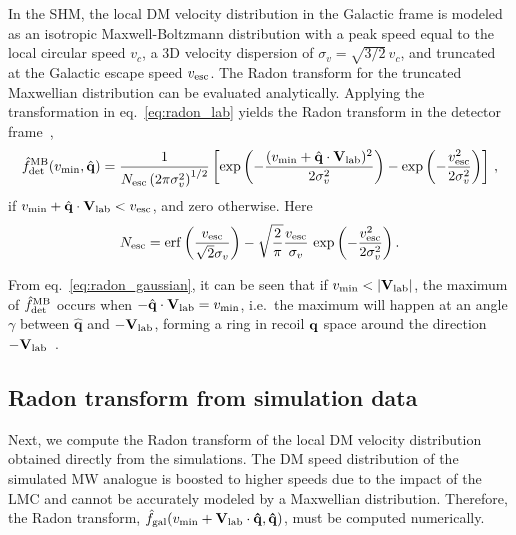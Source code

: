 \documentclass[a4paper,11pt]{article}
\begin{document}
In the SHM, the local DM velocity distribution in the Galactic frame is modeled as an isotropic Maxwell-Boltzmann distribution with a peak speed equal to the local circular speed $v_c$, a 3D velocity dispersion of $\sigma_v=\sqrt{3/2}\,v_c$, and truncated at the Galactic escape speed  $v_{\rm esc}$. The Radon transform for the truncated Maxwellian distribution can be evaluated analytically. Applying the transformation in eq.~\eqref{eq:radon_lab} yields the Radon transform in the detector frame~\cite{Gondolo:2002np},
%
\begin{equation}
    \hat{f}_{\rm{det}}^{\rm MB}(v_{\rm min},\hat{\mathbf{q}}) = \frac{1}{N_{\rm esc}\left(2 \pi \sigma_v^2 \right)^{1/2} }\left[\exp\left(- \frac{(v_{\rm min} + \hat{\mathbf{q}}\cdot \mathbf{V}_{\rm{lab}})^2}{2\sigma_{v}^2}\right)-\exp\left(-\frac{v_{\rm esc}^2}{2\sigma_v^2
    }\right)\right]\,,
    \label{eq:radon_gaussian}
\end{equation}
if $v_{\rm min}+\hat{\bf q}\cdot {\bf V}_{\rm lab}<v_{\rm esc}$, and zero otherwise. Here
\begin{equation}
N_{\rm esc}={\rm erf}\left(\frac{v_{\rm esc}}{\sqrt{2}\sigma_v}\right)-\sqrt{\frac{2}{\pi}}\frac{v_{\rm esc}}{\sigma_v}\,\exp\left(-\frac{v_{\rm esc}^2}{2\sigma_v^2}\right).
\end{equation}

From eq.~\eqref{eq:radon_gaussian}, it can be seen that if $v_{\rm min} < |\mathbf{V}_{\rm{lab}}|$, the maximum of $\hat f_{\rm det}^{\rm MB}$ occurs when $-\hat{\mathbf{q}}\cdot \mathbf{V}_{\rm lab} = v_{\rm min}$, i.e.~the maximum will happen at an angle $\gamma$ between $\hat{\mathbf{q}}$ and $-\mathbf{V}_{\rm{lab}}$, forming a ring in recoil ${\bf q}$ space around the direction $-\mathbf{V}_{\rm{lab}}$~\cite{Bozorgnia:2011vc}. 



\subsection{Radon transform from simulation data}
\label{sec:numerical_radon}

Next, we  compute the Radon transform of the local DM velocity distribution obtained directly from the simulations. The  DM speed distribution of the simulated MW analogue is boosted to higher speeds due to the impact of the LMC and  cannot be accurately modeled by a Maxwellian distribution. Therefore, the Radon transform, $\hat{f}_{\rm{gal}}(v_{\rm min} + \bf{V}_{\rm{lab}}\cdot \hat{\bf{q}},\hat{\bf{q}})$, must be computed numerically. 
\end{document}

